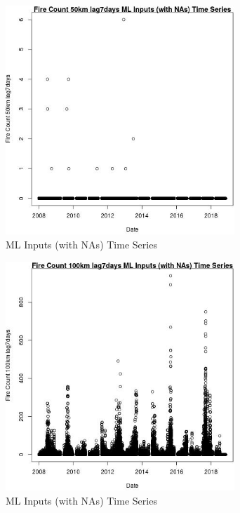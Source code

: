 \begin{figure} 
\centering  
\includegraphics[width=0.77\textwidth]{Code_Outputs/Report_ML_input_PM25_Step4_part_e_de_duplicated_aves_compiled_2019-05-20wNAs_Fire_Count_50km_lag7daysvDate.jpg} 
\caption{\label{fig:Report_ML_input_PM25_Step4_part_e_de_duplicated_aves_compiled_2019-05-20wNAsFire_Count_50km_lag7daysvDate}ML Inputs (with NAs) Time Series} 
\end{figure} 
 

\begin{figure} 
\centering  
\includegraphics[width=0.77\textwidth]{Code_Outputs/Report_ML_input_PM25_Step4_part_e_de_duplicated_aves_compiled_2019-05-20wNAs_Fire_Count_100km_lag7daysvDate.jpg} 
\caption{\label{fig:Report_ML_input_PM25_Step4_part_e_de_duplicated_aves_compiled_2019-05-20wNAsFire_Count_100km_lag7daysvDate}ML Inputs (with NAs) Time Series} 
\end{figure} 
 

